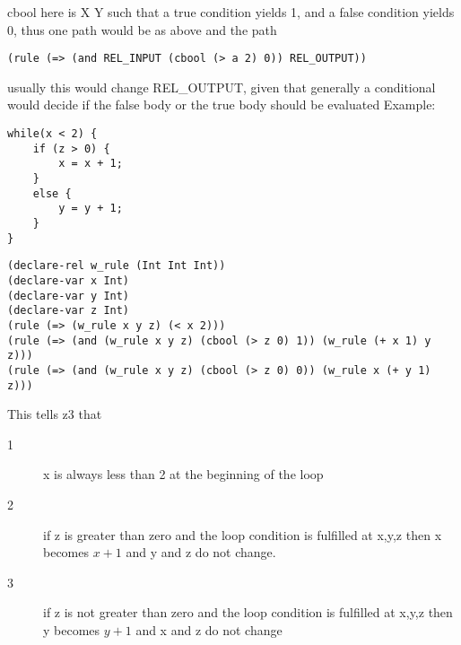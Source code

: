 \documentclass[11pt]{article}
\begin{document}
cbool here is X Y such that a true condition yields 1, and a false condition yields 0, thus one path would be as above and the path\\
\begin{verbatim}
(rule (=> (and REL_INPUT (cbool (> a 2) 0)) REL_OUTPUT))
\end{verbatim}
usually this would change REL\_OUTPUT, given that generally a conditional would decide if the false body or the true body should be evaluated
Example:
\begin{lstlisting}
while(x < 2) {
	if (z > 0) {
		x = x + 1;
	}
	else {
		y = y + 1;
	}
}
\end{lstlisting}
\begin{verbatim}
(declare-rel w_rule (Int Int Int))	
(declare-var x Int)
(declare-var y Int)
(declare-var z Int)
(rule (=> (w_rule x y z) (< x 2)))
(rule (=> (and (w_rule x y z) (cbool (> z 0) 1)) (w_rule (+ x 1) y z)))
(rule (=> (and (w_rule x y z) (cbool (> z 0) 0)) (w_rule x (+ y 1) z)))
\end{verbatim}
This tells z3 that
\begin{description}
\item[1] x is always less than 2 at the beginning of the loop
\item[2] if z is greater than zero and the loop condition is fulfilled at x,y,z then x becomes $x + 1$ and y and z do not change.
\item[3] if z is not greater than zero and the loop condition is fulfilled at x,y,z then y becomes $y + 1$ and x and z do not change
\end{description}
\end{document}
